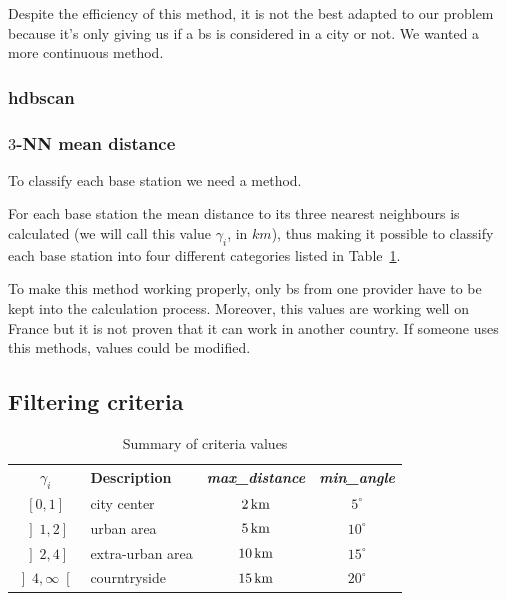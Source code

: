 \documentclass[lettersize,journal,english]{IEEEtran}
\begin{document}
Despite the efficiency of this method, it is not the best adapted to our problem because it's only giving us if a \acrshort{bs} is considered in a city or not.
We wanted a more continuous method.

\subsubsection{\acrshort{hdbscan}}

\subsubsection{$3$-NN mean distance}
To classify each base station we need a method.

For each base station the mean distance to its three nearest neighbours is calculated (we will call this value $\gamma_i$, in $\unit{km}$), thus making it possible to classify each base station into four different categories listed in Table~\ref{table:crit_summary}.

To make this method working properly, only \acrshort{bs} from one provider have to be kept into the calculation process.
Moreover, this values are working well on France but it is not proven that it can work in another country. If someone uses this methods, values could be modified.

\subsection{Filtering criteria}

\begin{table}[!b]
    \centering
    \caption{Summary of criteria values}
    \label{table:crit_summary}
    \begin{tabular}{clcc}
        \toprule
        \textbf{$\gamma_i$} & \textbf{Description} & \textbf{\emph{max\_distance}} & \textbf{\emph{min\_angle}} \\
        \cmidrule(lr){1-4}
        $\left[0, 1\right]$ & city center & $\unit[2]{km}$ & $5^\circ$ \\
        $\left]1, 2\right]$ & urban area & $\unit[5]{km}$ & $10^\circ$ \\
        $\left]2, 4\right]$ & extra-urban area & $\unit[10]{km}$ & $15^\circ$ \\
        $\left]4, \infty\right[$ & courntryside & $\unit[15]{km}$ & $20^\circ$ \\
        \bottomrule
    \end{tabular}
\end{table}
\end{document}
